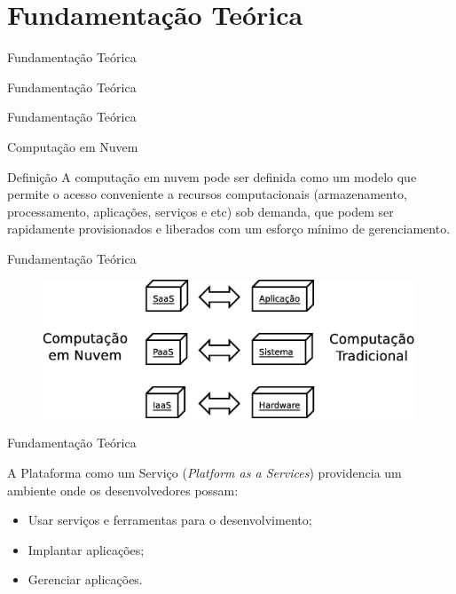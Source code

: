 \documentclass{beamer}
\begin{document}
\section{Fundamentação Teórica}

    \begin{frame}{Fundamentação Teórica}
        \Huge{\centerline{Fundamentação Teórica}}
    \end{frame}

    \begin{frame}{Fundamentação Teórica}
    
        Computação em Nuvem
        
        \begin{block}{Definição}
        	A computação em nuvem pode ser definida como um modelo que permite o acesso conveniente a recursos computacionais (armazenamento, processamento, aplicações, serviços e etc) sob demanda, que podem ser rapidamente provisionados e liberados com um esforço mínimo de gerenciamento. 
        \end{block}
    
    \end{frame}
       
    \begin{frame}{Fundamentação Teórica}
    
        \begin{figure}[ht]
            \includegraphics[width=0.99\textwidth]{img/arq-trad-nuvem.eps}
        \end{figure}
    
    \end{frame}
    
    \begin{frame}{Fundamentação Teórica}
    
        A Plataforma como um Serviço (\emph{Platform as a Services}) providencia um ambiente onde os desenvolvedores possam:

        \medskip
        \begin{itemize}
            \item Usar serviços e ferramentas para o desenvolvimento;
            \medskip
            \item Implantar aplicações;
            \medskip
            \item Gerenciar aplicações.
        \end{itemize}
    
    \end{frame}
    
\end{document}
